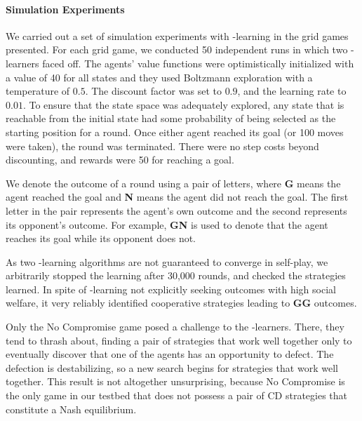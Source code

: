 
\vspace{\up}
\paragraph{Simulation Experiments}
\label{sec:qlearning}

We carried out a set of simulation experiments with \Q-learning in
the grid games presented.
%
For each grid game, we conducted 50 independent runs in which two
\Q-learners faced off.  
The agents' value functions were optimistically initialized with a
value of 40 for all states and they used Boltzmann exploration with a
temperature of $0.5$.  The discount factor was set to $0.9$, and the
learning rate to $0.01$.  To ensure that the state space was
adequately explored, any state that is reachable from the initial
state had some probability of being selected as the starting position
for a round.  Once either agent reached its goal (or 100 moves were
taken), the round was terminated.  There were no step costs beyond discounting, and
rewards were 50 for reaching a goal.

We denote the outcome of a round using a pair of letters, where {\bf G} 
means the agent reached the goal and {\bf N} means the agent did not
reach the goal. The first letter in the pair represents the agent's
own outcome and the second represents its opponent's outcome. For
example, {\bf GN} is used to denote that the agent reaches its goal
while its opponent does not.

As two \Q-learning algorithms are not guaranteed to converge in
self-play, we arbitrarily stopped the learning after 30,000 rounds,
and checked the strategies learned.  In spite of \Q-learning not
explicitly seeking outcomes with high social welfare, it very reliably
identified cooperative strategies leading to {\bf GG} outcomes.

Only the No Compromise game posed a challenge to the \Q-learners.
There, they tend to thrash about, finding a pair of strategies that
work well together only to eventually discover that one of the agents
has an opportunity to defect.  The defection is destabilizing, so a
new search begins for strategies that work well together.  This result
is not altogether unsurprising, because No Compromise is the only game
in our testbed that does not possess a pair of CD strategies that
constitute a Nash equilibrium.


